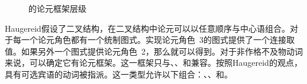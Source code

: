 \begin{exe}
\begin{xlist}[iv.]
\begin{exe}
\begin{xlist}[iv.]
\begin{figure}
{}
\caption{\label{Abbildung-Haugereid}\citet{Haugereid2007a}的论元框架层级}
\end{figure}%
Haugereid假设了二叉结构，在二叉结构中论元可以以任意顺序与中心语组合。对于每一个论元角色都有一个统制图式。实现论元角色~3的图式提供了一个连接取值。如果另外一个图式提供论元角色~2，那么就可以得到。对于非作格不及物动词来说，可以确定它有论元框架。这一框架只与、、和兼容。按照Haugereid的观点，具有可选宾语的动词被指派。这一类型允许以下组合：、、和。


\end{xlist}
\end{exe}
\end{xlist}
\end{exe}
